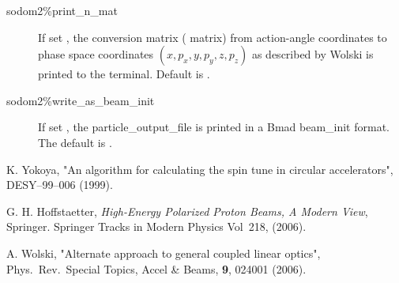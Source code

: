 \documentclass{hitec}     %
\begin{document}
\begin{description}
\item[sodom2\%print_n_mat] \Newline
If set , the conversion matrix ( matrix) from action-angle coordinates to phase space coordinates $(x, p_x, y, p_y,z, p_z)$ as described by Wolski \cite{b:wolski} is printed to the terminal. Default is .

\item[sodom2\%write_as_beam_init]\Newline
If set , the particle_output_file is printed in a Bmad beam_init format. The default is .

\end{description}

\begin{thebibliography}{9}
K. Yokoya, "An algorithm for calculating the spin tune in circular accelerators",
DESY–99–006 (1999).

G. H. Hoffstaetter, 
{\it High-Energy Polarized Proton Beams, A Modern View}, 
Springer. Springer Tracks in Modern Physics Vol~218, (2006).

A. Wolski, "Alternate approach to general coupled linear optics",
Phys.\ Rev.\ Special Topics, Accel \& Beams, {\bf 9}, 024001 (2006).



\end{thebibliography}
\end{document}
